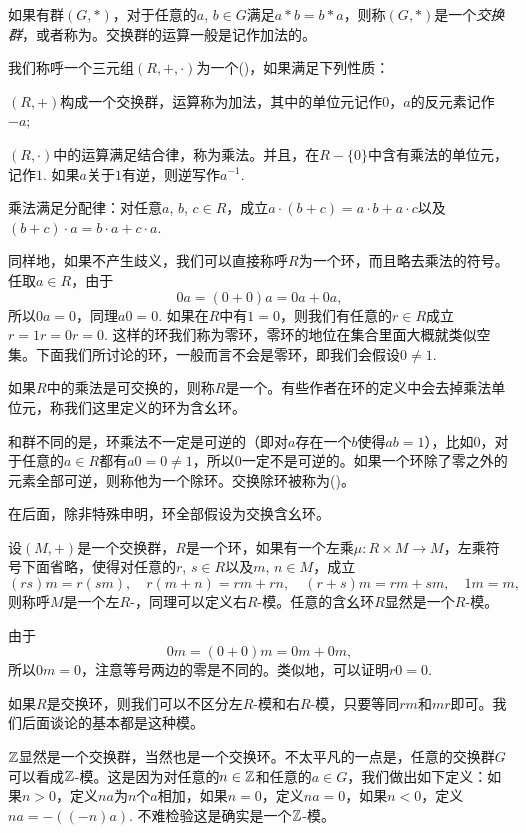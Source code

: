 如果有群$(G,*)$，对于任意的$a$, $b\in G$满足$a*b=b*a$，则称$(G,*)$是一个\textit{交换群}，或者称为。交换群的运算一般是记作加法的。

\para 我们称呼一个三元组$(R,+,\cdot)$为一个()，如果满足下列性质：

 $(R,+)$构成一个交换群，运算称为加法，其中的单位元记作$0$，$a$的反元素记作$-a$;

 $(R,\cdot)$中的运算满足结合律，称为乘法。并且，在$R-\{0\}$中含有乘法的单位元，记作$1$. 如果$a$关于$1$有逆，则逆写作$a^{-1}$.

 乘法满足分配律：对任意$a$, $b$, $c \in R$，成立$a\cdot(b+c)=a\cdot b+a\cdot c$以及$(b+c)\cdot a=b\cdot a+c\cdot a$.

同样地，如果不产生歧义，我们可以直接称呼$R$为一个环，而且略去乘法的符号。任取$a\in R$，由于
\[
	0a=(0+0)a=0a+0a,
\]
所以$0a=0$，同理$a0=0$. 如果在$R$中有$1=0$，则我们有任意的$r\in R$成立$r=1r=0r=0$. 这样的环我们称为零环，零环的地位在集合里面大概就类似空集。下面我们所讨论的环，一般而言不会是零环，即我们会假设$0\neq 1$.

如果$R$中的乘法是可交换的，则称$R$是一个。有些作者在环的定义中会去掉乘法单位元，称我们这里定义的环为含幺环。

和群不同的是，环乘法不一定是可逆的（即对$a$存在一个$b$使得$ab=1$），比如$0$，对于任意的$a\in R$都有$a0=0\neq 1$，所以$0$一定不是可逆的。如果一个环除了零之外的元素全部可逆，则称他为一个除环。交换除环被称为()。

在后面，除非特殊申明，环全部假设为交换含幺环。

\para 设$(M,+)$是一个交换群，$R$是一个环，如果有一个左乘$\mu:R\times M\to M$，左乘符号下面省略，使得对任意的$r$, $s\in R$以及$m$, $n\in M$，成立
\[
	(rs)m=r(sm),\quad r(m+n)=rm+rn,\quad (r+s)m=rm+sm,\quad 1m=m,
\]
则称呼$M$是一个左$R$-，同理可以定义右$R$-模。任意的含幺环$R$显然是一个$R$-模。

由于
\[
	0m=(0+0)m=0m+0m,
\]
所以$0m=0$，注意等号两边的零是不同的。类似地，可以证明$r0=0$. 

如果$R$是交换环，则我们可以不区分左$R$-模和右$R$-模，只要等同$rm$和$mr$即可。我们后面谈论的基本都是这种模。

\para $\mathbb{Z}$显然是一个交换群，当然也是一个交换环。不太平凡的一点是，任意的交换群$G$可以看成$\mathbb{Z}$-模。这是因为对任意的$n\in \mathbb{Z}$和任意的$a\in G$，我们做出如下定义：如果$n>0$，定义$na$为$n$个$a$相加，如果$n=0$，定义$na=0$，如果$n<0$，定义$na=-((-n)a)$. 不难检验这是确实是一个$\mathbb{Z}$-模。


